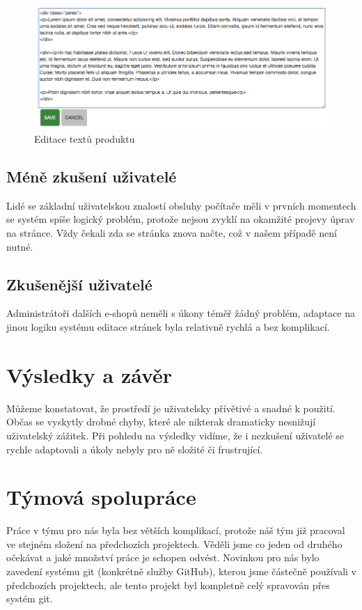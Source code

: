\documentclass[11pt,a4paper]{article}
\begin{document}
\begin{figure}[h]
    \centering
    \includegraphics[width=\textwidth]{edit.png}
    \caption{Editace textů produktu}
\end{figure}

\subsection*{Méně zkušení uživatelé}
Lidé se základní uživatelskou znalostí obsluhy počítače měli v prvních momentech se systém spíše logický problém, protože nejsou zvyklí na okamžité projevy úprav na stránce. Vždy čekali zda se stránka znova načte, což v našem případě není nutné.

\subsection*{Zkušenější uživatelé}
Administrátoři dalších e-shopů neměli s úkony téměř žádný problém, adaptace na jinou logiku systému editace stránek byla relativně rychlá a bez komplikací.

\section*{Výsledky a závěr}
Můžeme konstatovat, že prostředí je uživatelsky přívětivé a snadné k použití. Občas se vyskytly drobné chyby, které ale nikterak dramaticky nesnižují uživatelský zážitek. Při pohledu na výsledky vidíme, že i nezkušení uživatelé se rychle adaptovali a úkoly nebyly pro ně složité či frustrující.


\section*{Týmová spolupráce}
Práce v týmu pro nás byla bez větších komplikací, protože náš tým již pracoval ve stejném složení na předchozích projektech. Věděli jsme co jeden od druhého očekávat a jaké množství práce je schopen odvést. Novinkou pro nás bylo zavedení systému git\cite{git} (konkrétně služby GitHub), kterou jsme částečně používali v předchozích projektech, ale tento projekt byl kompletně celý spravován přes systém git.
\end{document}
